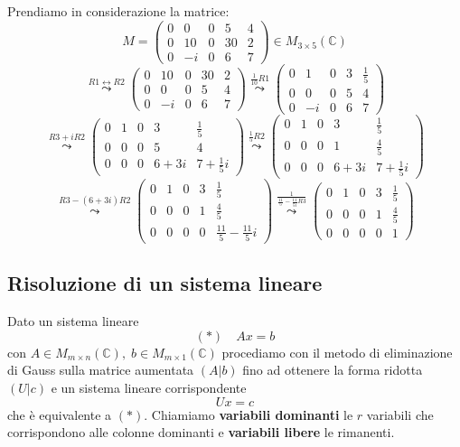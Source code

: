 \documentclass[a4paper]{article}
\theoremstyle{break}
\theoremstyle{break}
\theoremstyle{break}
\theoremstyle{break}
\begin{document}
\begin{example}
  Prendiamo in considerazione la matrice:
  \[
  M = \begin{pmatrix}
    0 & 0 & 0 & 5 & 4 \\
    0 & 10 & 0 & 30 & 2 \\
    0 & -i & 0 & 6 & 7
  \end{pmatrix} \in M_{3 \times 5}(\mathbb{C})
  \] 
  \[
  \stackrel{R1 \leftrightarrow R2}{\leadsto}
  \begin{pmatrix}
    0 & 10 & 0 & 30 & 2 \\
    0 & 0 & 0 & 5 & 4 \\
    0 & -i & 0 & 6 & 7
  \end{pmatrix}
  \stackrel{\frac{1}{10}R1}{\leadsto}
  \begin{pmatrix}
    0 & 1 & 0 & 3 & \frac{1}{5} \\
    0 & 0 & 0 & 5 & 4 \\
    0 & -i & 0 & 6 & 7
  \end{pmatrix}
  \] 
  \[
  \stackrel{R3 + iR2}{\leadsto}
  \label{D4 D5 D6 D7}
  \begin{pmatrix}
    0 & 1 & 0 & 3 & \frac{1}{5} \\
    0 & 0 & 0 & 5 & 4 \\
    0 & 0 & 0 & 6 + 3i & 7 + \frac{1}{5}i
  \end{pmatrix}
  \stackrel{\frac{1}{5}R2}{\leadsto}
  \begin{pmatrix}
    0 & 1 & 0 & 3 & \frac{1}{5} \\
    0 & 0 & 0 & 1 & \frac{4}{5} \\
    0 & 0 & 0 & 6 + 3i & 7 + \frac{1}{5}i
  \end{pmatrix}
  \] 
  \[
  \stackrel{R3 - (6 + 3i)R2}{\leadsto}
  \begin{pmatrix}
    0 & 1 & 0 & 3 & \frac{1}{5} \\
    0 & 0 & 0 & 1 & \frac{4}{5} \\
    0 & 0 & 0 & 0 & \frac{11}{5} - \frac{11}{5}i
  \end{pmatrix}
  \stackrel{\frac{1}{\frac{11}{5}-\frac{11}{5i}R3}}{\leadsto}
  \begin{pmatrix}
    0 & 1 & 0 & 3 & \frac{1}{5} \\
    0 & 0 & 0 & 1 & \frac{4}{5} \\
    0 & 0 & 0 & 0 & 1
  \end{pmatrix}
  \] 
\end{example}

\subsection{Risoluzione di un sistema lineare}
Dato un sistema lineare
\[
  (*)\quad Ax=b
\] 
con \( A \in M_{m \times n}(\mathbb{C}),\; b \in M_{m \times 1}(\mathbb{C}) \) procediamo con
il metodo di eliminazione di Gauss sulla matrice aumentata \( (A | b) \) fino ad ottenere la
forma ridotta \( (U | c) \) e un sistema lineare corrispondente
\[
Ux = c
\] 
che è equivalente a \( (*) \). Chiamiamo \textbf{variabili dominanti} le \( r \) variabili
che corrispondono alle colonne dominanti e \textbf{variabili libere} le rimanenti.
\end{document}
